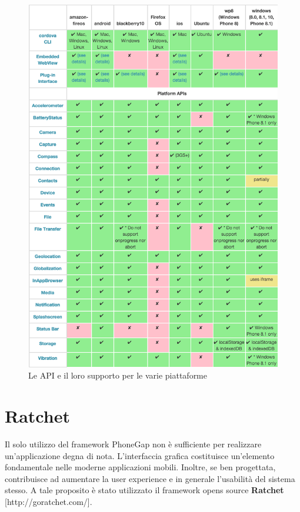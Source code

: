 \begin{figure}[H]
	\centering
	\includegraphics[scale=0.8]{Implementazione/phonegap_api.png}
	\caption{Le API e il loro supporto per le varie piattaforme}
	\label{fig:tabella_api}
\end{figure}

\section{Ratchet}
\label{ratchet}
Il solo utilizzo del framework PhoneGap non è sufficiente per realizzare un'applicazione degna di nota. L'interfaccia grafica costituisce un'elemento fondamentale nelle moderne applicazioni mobili. Inoltre, se ben progettata, contribuisce ad aumentare la user experience \cite{EXPERIENCE} e in generale l'usabilità del sistema stesso. A tale proposito è stato utilizzato il framework opens source \textbf{Ratchet} [http://goratchet.com/].

